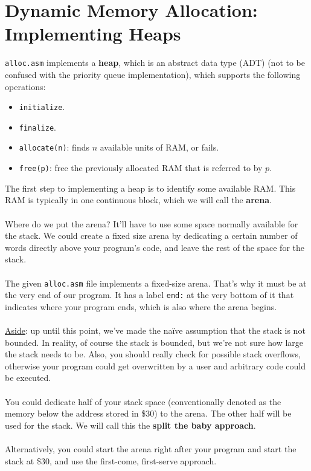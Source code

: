 \documentclass[]{article}
\theoremstyle{definition}
\begin{document}
	\section{Dynamic Memory Allocation: Implementing Heaps}
		\verb+alloc.asm+ implements a \textbf{heap}, which is an abstract data type (ADT) (not to be confused with the priority queue implementation), which supports the following operations:
		\begin{itemize}
			\item \verb+initialize+.
			\item \verb+finalize+.
			\item \verb+allocate(n)+: finds $n$ available units of RAM, or fails.
			\item \verb+free(p)+: free the previously allocated RAM that is referred to by $p$.
		\end{itemize}

		The first step to implementing a heap is to identify some available RAM. This RAM is typically in one continuous block, which we will call the \textbf{arena}.
		\\ \\
		Where do we put the arena? It'll have to use some space normally available for the stack. We could create a fixed size arena by dedicating a certain number of words directly above your program's code, and leave the rest of the space for the stack. 
		\\ \\
		The given \verb+alloc.asm+ file implements a fixed-size arena. That's why it must be at the very end of our program. It has a label \verb+end:+ at the very bottom of it that indicates where your program ends, which is also where the arena begins.
		\\ \\
		\underline{Aside}: up until this point, we've made the na\"ive assumption that the stack is not bounded. In reality, of course the stack is bounded, but we're not sure how large the stack needs to be. Also, you should really check for possible stack overflows, otherwise your program could get overwritten by a user and arbitrary code could be executed.
		\\ \\
		You could dedicate half of your stack space (conventionally denoted as the memory below the address stored in \$30) to the arena. The other half will be used for the stack. We will call this the \textbf{split the baby approach}.
		\\ \\
		Alternatively, you could start the arena right after your program and start the stack at \$30, and use the first-come, first-serve approach.
\end{document}
